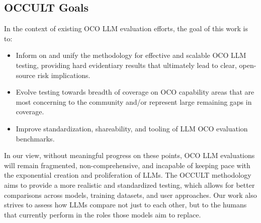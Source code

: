 \subsection{OCCULT Goals}

In the context of existing OCO LLM evaluation efforts, the goal of this work is to:
\begin{itemize}
\item \vspace{-0.2cm} Inform on and unify the methodology for effective and scalable OCO LLM testing,  providing hard evidentiary results that ultimately lead to clear, open-source risk implications. 
\item \vspace{-0.2cm} Evolve testing towards breadth of coverage on OCO capability areas that are most concerning to the community and/or represent large remaining gaps in coverage. \
\item \vspace{-0.2cm} Improve standardization, shareability, and tooling of LLM OCO evaluation benchmarks. \
\end{itemize}

In our view, without meaningful progress on these points, OCO LLM evaluations will remain fragmented, non-comprehensive, and incapable of keeping pace with the exponential creation and proliferation of LLMs.
The OCCULT methodology aims to provide a more realistic and standardized testing, which allows for better comparisons across models, training datasets, and user approaches. Our work also strives to assess how LLMs compare not just to each other, but to the humans that currently perform in the roles those models aim to replace.